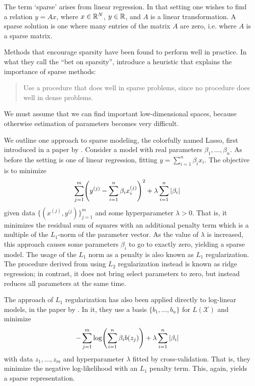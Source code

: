 \documentclass[cclicense]{hmcthesis}
\providecommand*{\xs}{\mathcal X}
\numberwithin{equation}{chapter}
\numberwithin{thmcounter}{chapter}
\begin{document}
    \begin{example}
        The term `sparse' arises from linear regression.  In that setting one
        wishes to find a relation $y = Ax$, where $x \in \mathbb{R}^N$, $y \in \mathbb{R}$, and
        $A$ is a linear transformation.  A sparse solution is one where many
        entries of the matrix $A$ are zero, i.e. where $A$ is a sparse matrix.
    \end{example}
    
    Methods that encourage sparsity have been found to perform well in practice.
    In what they call the ``bet on sparsity'', \citet{EOSL} introduce a
    heuristic that explains the importance of sparse methods:
    \begin{quote}
        Use a procedure that does well in sparse problems, since no procedure
        does well in dense problems.
    \end{quote}
    \noindent We must assume that we can find important low-dimensional spaces,
    because otherwise estimation of parameters becomes very difficult.

    We outline one approach to sparse modeling, the colorfully named Lasso, first
    introduced in a paper by \citet{LASSO}.  Consider a model with real
    parameters $\beta_1, \ldots, \beta_n$.  As before the setting is one of
    linear regression, fitting $y = \sum_{i=1}^n \beta_i x_i$.  The objective is to
    minimize
    \[
        \sum_{j=1}^m \pdel*{y^{(j)} - \sum_{i=1}^n \beta_i x_i^{(j)}}^2 +
        \lambda \sum_{i=1}^n |\beta_i|
    \]
    given data $\{(x^{(j)}, y^{(j})\}_{j=1}^m$ and some hyperparameter $\lambda
    > 0$.  That is, it minimizes the residual sum of squares with an additional
    penalty term which is a multiple of the $L_1$-norm of the parameter vector.
    As the value of $\lambda$ is increased, this approach causes some parameters
    $\beta_i$ to go to exactly zero, yielding a sparse model.  The usage of the
    $L_1$ norm as a penalty is also known as $L_1$ regularization.  The
    procedure derived from using $L_2$ regularization instead is known as ridge
    regression; in contrast, it does not bring select parameters to zero, but
    instead reduces all parameters at the same time.

    The approach of $L_1$ regularization has also been applied directly to
    log-linear models, in the paper by \citet{SPEC}.  In it, they use a basis
    $\{b_1, \ldots, b_n\}$ for $L(\xs)$ and minimize
    \[
        - \sum_{j=1}^m \log \pdel*{\sum_{i=1}^n \beta_i b(z_j)} + \lambda
        \sum_{i=1}^n |\beta_i| 
    \]
    with data $z_1, \ldots, z_m$ and hyperparameter $\lambda$ fitted by
    cross-validation.  That is, they minimize the negative log-likelihood with
    an $L_1$ penalty term.  This, again, yields a sparse representation.
\end{document}

